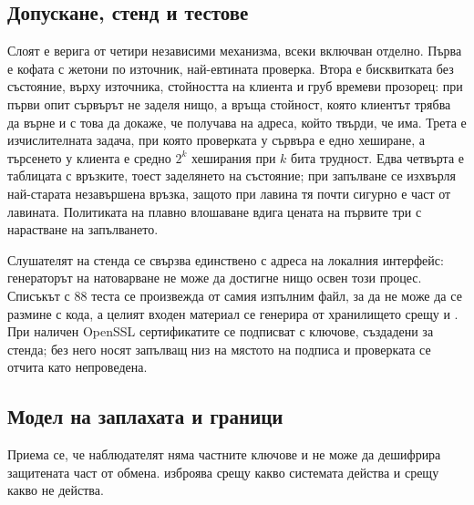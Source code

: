 \subsection{Допускане, стенд и тестове}
\label{subsec:admission_design}

Слоят е верига от четири независими механизма, всеки включван отделно. Първа е кофата с жетони по
източник, най-евтината проверка. Втора е бисквитката без състояние,  върху
източника, стойността на клиента и груб времеви прозорец: при първи опит сървърът не заделя нищо,
а връща стойност, която клиентът трябва да върне и с това да докаже, че получава на адреса, който
твърди, че има. Трета е изчислителната задача, при която проверката у сървъра е едно хеширане, а
търсенето у клиента е средно $2^{k}$ хеширания при $k$ бита трудност. Едва четвърта е таблицата с
връзките, тоест заделянето на състояние; при запълване се изхвърля най-старата незавършена връзка,
защото при лавина тя почти сигурно е част от лавината. Политиката на плавно влошаване вдига цената
на първите три с нарастване на запълването.

Слушателят на стенда се свързва единствено с адреса на локалния интерфейс: генераторът на
натоварване не може да достигне нищо освен този процес. Списъкът с 88 теста се произвежда от
самия изпълним файл, за да не може да се размине с кода, а целият входен материал се генерира от
хранилището срещу \cite{rfc8446} и \cite{rfc5280}. При наличен OpenSSL сертификатите се подписват
с ключове, създадени за стенда; без него носят запълващ низ на мястото на подписа и проверката
се отчита като непроведена.

\subsection{Модел на заплахата и граници}
\label{subsec:threat_model}

Приема се, че наблюдателят няма частните ключове и не може да дешифрира защитената част от
обмена.  изброява срещу какво системата действа и срещу какво не действа.

